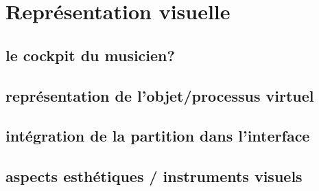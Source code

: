 %
\chapter{Représentation visuelle}
\label{ch:visual_representation}


\section{le cockpit du musicien?}
\label{sec:visual_representation:sec1}

\section{représentation de l'objet/processus virtuel}

\section{intégration de la partition dans l'interface}

\section{aspects esthétiques / instruments visuels}
